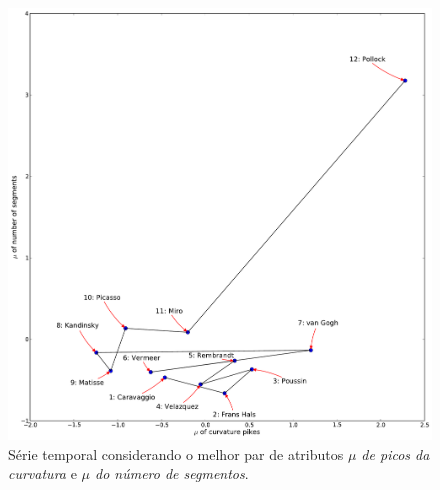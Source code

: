 \begin{figure}[h!]
\begin{center}
        \includegraphics[scale=.5]{figs/caso1_g2}
      \caption{Série temporal considerando o melhor par de
        atributos \emph{$\mu$ de picos da curvatura} e \emph{$\mu$ do número de segmentos}.}
        \label{fig:caso1_g2}
\end{center}
\end{figure}

